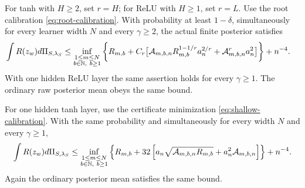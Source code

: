 \begin{theorem}
\label{thm:network-main}
For tanh with $H\ge2$, set $r=H$; for ReLU with $H\ge1$, set $r=L$. Use the root calibration \eqref{eq:root-calibration}. With probability at least $1-\delta$, simultaneously for every learner width $N$ and every $\gamma\ge2$, the actual finite posterior satisfies
\begin{align}
 \int R(z_w)d\Pi_{S,\lambda_S}
 \le\inf_{\substack{1\le m\le N\\b\in\mathbb N,\ b\ge1}}
 \bigg\{R_{m,b}+C_r\big[&\mathcal A_{m,b,n}R_{m,b}^{1-1/r}a_n^{2/r}
                  +\mathcal A_{m,b,n}^ra_n^2\big]\bigg\}+n^{-4}.
 \label{eq:network-main}
\end{align}
With one hidden ReLU layer the same assertion holds for every $\gamma\ge1$. The ordinary raw posterior mean obeys the same bound.

For one hidden tanh layer, use the certificate minimization \eqref{eq:shallow-calibration}. With the same probability and simultaneously for every width $N$ and every $\gamma\ge1$,
\begin{align}
 \int R(z_w)d\Pi_{S,\lambda_S}
 \le\inf_{\substack{1\le m\le N\\b\in\mathbb N,\ b\ge1}}
 \left\{R_{m,b}+32\left[
 a_n\sqrt{\mathcal A_{m,b,n}R_{m,b}}
       +a_n^2\mathcal A_{m,b,n}\right]\right\}+n^{-4}.
 \label{eq:network-shallow}
\end{align}
Again the ordinary posterior mean satisfies the same bound.
\end{theorem}
